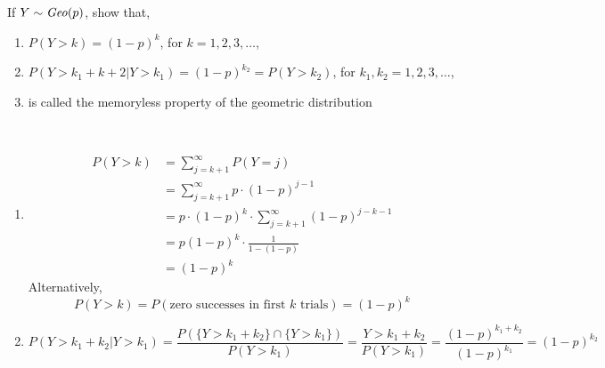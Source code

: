 \begin{example}
    If $Y \sim \text{\emph{Geo}}(p)$, show that, 
    \begin{enumerate}[noitemsep, topsep=0em]
        \item $P(Y > k) = (1 - p)^k$, for $k = 1, 2, 3, \dots$, 
        \item $P(Y > k_1 + k+2 \vert Y > k_1) = (1 - p)^{k_2} = P(Y > k_2)$,
              for $k_1, k_2 = 1, 2, 3, \dots$,
        \item is called the memoryless property of the geometric distribution
    \end{enumerate}
\end{example}
\begin{solution} \quad                                                       \\
    \begin{enumerate}[noitemsep, topsep=0em]
        \item 
        \begin{align*}
           P(Y > k) &= \sum_{j = k + 1}^\infty P(Y = j)                      \\
                    &= \sum_{j = k + 1}^\infty p \cdot (1 - p)^{j - 1}       \\
                    &= p \cdot (1 - p)^k \cdot \sum_{j = k + 1}^\infty        
                       (1 - p)^{j - k - 1}                                   \\
                    &= p (1 - p)^k \cdot \frac{1}{1 - (1 - p)}               \\
                    &= (1 - p)^k                                             
        \end{align*}
        Alternatively,
        \[ P(Y > k) = P(\text{zero successes in first $k$ trials})
                    = (1 - p)^k                                              \]
        \item
        \[   P(Y > k_1 + k_2 \vert Y > k_1)
           = \frac{P(\lbrace Y > k_1 + k_2 \rbrace \cap \lbrace Y > k_1
             \rbrace)}{P(Y > k_1)}  
           = \frac{Y > k_1 + k_2}{P(Y > k_1)}
           = \frac{(1 - p)^{k_1 + k_2}}{(1 - p)^{k_1}}
           = (1 - p)^{k_2}                                                   \]
    \end{enumerate}
\end{solution}

